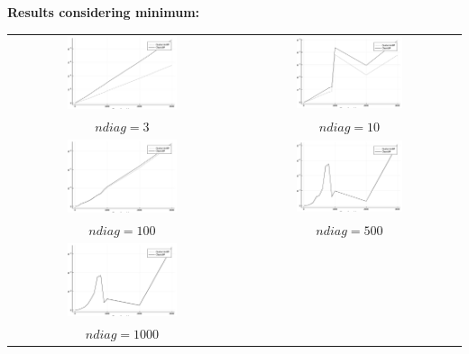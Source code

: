 \documentclass[a4paper,11pt]{article}
\begin{document}
\newpage
\bf{Results considering minimum:}\\

\begin{tabular}{cc}
	\includegraphics[width=0.5\textwidth]{perf_minimum_3} & 
	\includegraphics[width=0.5\textwidth]{perf_minimum_10} \\
	$ndiag = 3$ & $ndiag = 10$\\
	\includegraphics[width=0.5\textwidth]{perf_minimum_100} &
	\includegraphics[width=0.5\textwidth]{perf_minimum_500} \\
	$ndiag = 100$ & $ndiag = 500$\\
	\includegraphics[width=0.5\textwidth]{perf_minimum_1000} & \\
	$ndiag = 1000$ & 
\end{tabular}
\end{document}
